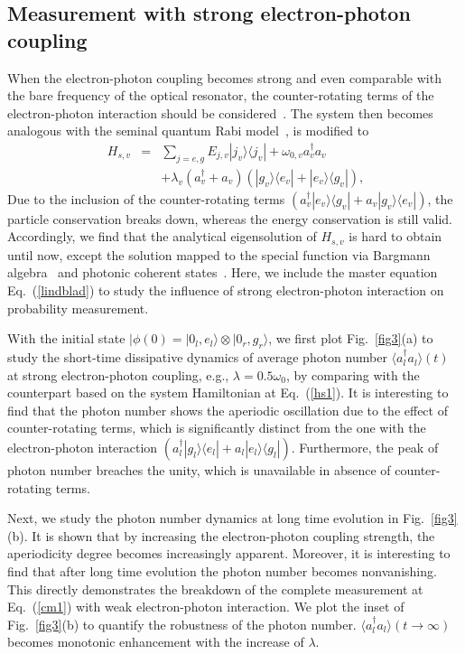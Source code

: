 \documentclass[twocolumn,showpacs,preprintnumbers,amsmath,amssymb]{revtex4}
\begin{document}
	
	
	\subsection{Measurement with strong electron-photon coupling}
	When the electron-photon coupling becomes strong
	and even comparable with the bare frequency of the optical resonator, the counter-rotating terms of the electron-photon interaction should be considered~\cite{mk2014prb,bka2016prb,jclu2019prb}.
	The system then becomes analogous with the seminal quantum Rabi model~\cite{dbraak2011prl,afk2019nrp,pfd2019rmp},
	is modified to
	\begin{eqnarray}~\label{hs2}
		H_{s,v}&=&\sum_{j=e,g}E_{j,v}|j_{v}{\rangle}{\langle}j_v|+\omega_{0,v} a^\dagger_v a_v\\
		&&+\lambda_v(a^\dagger_v+a_v)(|g_{v}{\rangle}{\langle}e_v|+ |e_{v}{\rangle}{\langle}g_v|),\nonumber
	\end{eqnarray}
	Due to the inclusion of the counter-rotating terms
	$(a^{\dagger}_v|e_{v}{\rangle}{\langle}g_v|+a_v|g_{v}{\rangle}{\langle}e_v|)$, the particle conservation breaks  down,
	whereas the energy conservation is still valid.
	Accordingly, we find that the analytical eigensolution of $H_{s,v}$ is hard to obtain until now, except the solution mapped to the special function via Bargmann algebra~\cite{dbraak2011prl} and
	photonic coherent states~\cite{qhchen2012pra}.
	Here, we include the master equation Eq.~(\ref{lindblad})
	to study the influence of strong electron-photon interaction on probability measurement.
	
	
	With the initial state $|\phi(0)=|0_{l},e_{{l}}\rangle{\otimes}|0_{r},g_{{r}}\rangle$,
we first plot  Fig.~\ref{fig3}(a) to study the short-time dissipative dynamics of average photon number
	${\langle}a^\dag_la_l{\rangle}(t)$ at strong electron-photon coupling, e.g., $\lambda=0.5\omega_0$,
	by comparing with the counterpart  based on the system Hamiltonian at Eq.~(\ref{hs1}).
	It is interesting to find that the photon number shows the aperiodic oscillation due to the effect of counter-rotating terms, which is significantly distinct from the one with the electron-photon interaction
	$(a^{\dagger}_{l}|g_{l}{\rangle}{\langle}e_l|
	+a_{l}|e_{l}{\rangle}{\langle}g_l|)$.
	Furthermore, the peak of photon number breaches the unity, which is unavailable in absence of counter-rotating terms.
	
	Next, we study the photon number dynamics at long time evolution in Fig.~\ref{fig3}(b).
	It is shown that by increasing the electron-photon coupling strength, the aperiodicity degree
	becomes increasingly apparent.
	Moreover, it is interesting to find that after long time evolution the photon number becomes
	nonvanishing.
	This directly demonstrates the breakdown of the complete measurement at Eq.~(\ref{cm1})
	with weak electron-photon interaction.
	We plot the inset of Fig.~\ref{fig3}(b) to quantify the robustness of the photon number.
	${\langle}a^\dag_{l}a_{l}{\rangle}(t{\rightarrow}\infty)$ becomes monotonic enhancement with the increase of $\lambda$.
	
\end{document}
